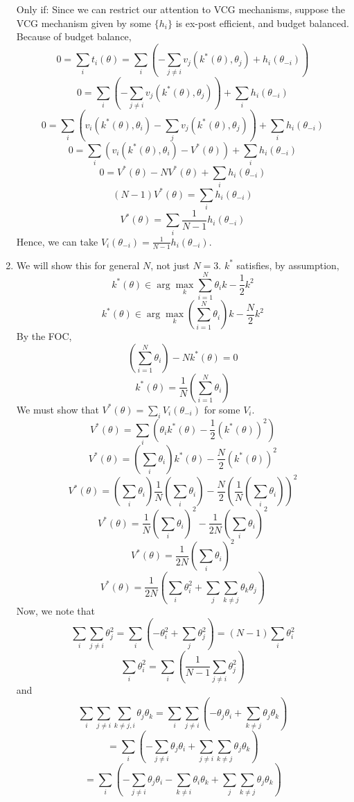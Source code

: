 \documentclass[10pt,letter]{article}
\begin{document}
\begin{enumerate}[label=(\alph*)]
  Only if: Since we can restrict our attention to VCG mechanisms, suppose the VCG mechanism given by some $\{ h_i \}$ is ex-post efficient, and budget balanced. Because of budget balance,
  \[ 0 = \sum_i t_i(\theta) = \sum_i\left( -\sum_{j \neq i} v_j(k^*(\theta), \theta_j) + h_i(\theta_{-i})\right) \]
  \[ 0 = \sum_i\left( -\sum_{j \neq i} v_j(k^*(\theta), \theta_j)\right) + \sum_i h_i(\theta_{-i}) \]
  \[ 0 = \sum_i\left( v_i(k^*(\theta), \theta_i)-\sum_{j} v_j(k^*(\theta), \theta_j)\right) + \sum_i h_i(\theta_{-i}) \]
  \[ 0 = \sum_i\left( v_i(k^*(\theta), \theta_i)-V^*(\theta)\right) + \sum_i h_i(\theta_{-i}) \]
  \[ 0 = V^*(\theta)- NV^*(\theta)+ \sum_i h_i(\theta_{-i}) \]
  \[ (N-1)V^*(\theta)= \sum_i h_i(\theta_{-i}) \]
  \[ V^*(\theta)= \sum_i \frac{1}{N-1}h_i(\theta_{-i}) \]
  Hence, we can take $V_i(\theta_{-i}) = \frac{1}{N-1}h_i(\theta_{-i})$.
  \item We will show this for general $N$, not just $N = 3$. $k^*$ satisfies, by assumption,
  \[ k^*(\theta) \in \arg\max_k \sum_{i=1}^N \theta_i k - \frac{1}{2}k^2 \]
  \[ k^*(\theta) \in \arg\max_k \left(\sum_{i=1}^N \theta_i\right) k - \frac{N}{2}k^2 \]
  By the FOC,
  \[ \left(\sum_{i=1}^N \theta_i\right) - N k^*(\theta) = 0 \]
  \[ k^*(\theta) = \frac{1}{N}\left(\sum_{i=1}^N \theta_i\right) \]
  We must show that $V^*(\theta) = \sum_i V_i(\theta_{-i})$ for some $V_i$.
  \[ V^*(\theta) = \sum_i \left(\theta_i k^*(\theta) - \frac{1}{2}(k^*(\theta))^2\right) \]
  \[ V^*(\theta) = \left(\sum_i \theta_i\right) k^*(\theta) - \frac{N}{2}(k^*(\theta))^2 \]
  \[ V^*(\theta) = \left(\sum_i \theta_i\right) \frac{1}{N}\left(\sum_{i} \theta_i\right) - \frac{N}{2}\left(\frac{1}{N}\left(\sum_{i} \theta_i\right)\right)^2 \]
  \[ V^*(\theta) = \frac{1}{N}\left(\sum_{i} \theta_i\right)^2 - \frac{1}{2N}\left(\sum_{i} \theta_i\right)^2 \]
  \[ V^*(\theta) = \frac{1}{2N}\left(\sum_{i} \theta_i\right)^2  \]
  \[ V^*(\theta) = \frac{1}{2N}\left(\sum_{i} \theta_i^2 + \sum_j \sum_{k \neq j} \theta_k \theta_j \right)  \]
  Now, we note that
  \[  \sum_i \sum_{j \neq i} \theta_j^2 = \sum_i \left(- \theta_i^2 + \sum_{j} \theta_j^2\right) = (N-1)\sum_i \theta_i^2  \]
  \[ \sum_i \theta_i^2 = \sum_i \left(\frac{1}{N-1}\sum_{j \neq i} \theta_j^2 \right) \]
  and
  \[ \sum_i \sum_{j \neq i} \sum_{k \neq j, i} \theta_j \theta_k = \sum_i \sum_{j \neq i} \left( - \theta_j \theta_i + \sum_{k \neq j} \theta_j \theta_k \right) \]
  \[ = \sum_i \left( - \sum_{j \neq i} \theta_j \theta_i + \sum_{j \neq i} \sum_{k \neq j} \theta_j \theta_k \right) \]
  \[ = \sum_i \left( - \sum_{j \neq i} \theta_j \theta_i -\sum_{k \neq i} \theta_i \theta_k + \sum_{j} \sum_{k \neq j} \theta_j \theta_k \right) \]

\end{enumerate}
\end{document}
